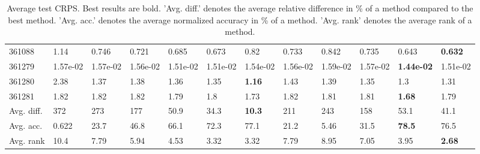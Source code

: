 \begin{table}[ht!]
\begin{tabular}{llllllllllll}
  361088 & 1.14 & 0.746 & 0.721 & 0.685 & 0.673 & 0.82 & 0.733 & 0.842 & 0.735 & 0.643 & \textbf{0.632} \\ 
  361279 & 1.57e-02 & 1.57e-02 & 1.56e-02 & 1.51e-02 & 1.51e-02 & 1.54e-02 & 1.56e-02 & 1.59e-02 & 1.57e-02 & \textbf{1.44e-02} & 1.51e-02 \\ 
  361280 & 2.38 & 1.37 & 1.38 & 1.36 & 1.35 & \textbf{1.16} & 1.43 & 1.39 & 1.35 & 1.3 & 1.31 \\ 
  361281 & 1.82 & 1.82 & 1.82 & 1.79 & 1.8 & 1.73 & 1.82 & 1.81 & 1.81 & \textbf{1.68} & 1.79 \\ 
   \hline
Avg. diff. & 372 & 273 & 177 & 50.9 & 34.3 & \textbf{10.3} & 211 & 243 & 158 & 53.1 & 41.1 \\ 
  Avg. acc. & 0.622 & 23.7 & 46.8 & 66.1 & 72.3 & 77.1 & 21.2 & 5.46 & 31.5 & \textbf{78.5} & 76.5 \\ 
  Avg. rank & 10.4 & 7.79 & 5.94 & 4.53 & 3.32 & 3.32 & 7.79 & 8.95 & 7.05 & 3.95 & \textbf{2.68} \\ 
   \hline
\hline
\end{tabular}
\endgroup
\caption{Average test CRPS. 
                  Best results are bold. 
                  'Avg. diff.' denotes the average relative difference in \% of a method compared to the best method.
                  'Avg. acc.' denotes the average normalized accuracy in \% of a method.
                  'Avg. rank' denotes the average rank of a method.} 
\label{TABLES/table_results_CRPS_clustering}
\end{table}
